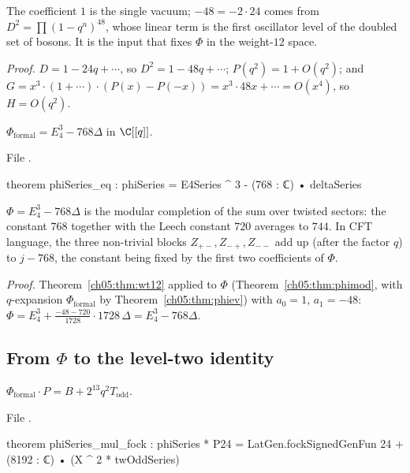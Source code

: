 \begin{physics}
The coefficient $1$ is the single vacuum; $-48=-2\cdot24$ comes from $D^2=\prod(1-q^n)^{48}$, whose linear term is the first oscillator level of the doubled set of bosons. It is the input that fixes $\Phi$ in the weight-$12$ space.
\end{physics}
\noindent\emph{Proof.} $D = 1 - 24q + \cdots$, so $D^2 = 1 - 48q+\cdots$; $P(q^2) = 1 + O(q^2)$; and $G =
x^3\cdot(1+\cdots)\cdot(P(x)-P(-x)) = x^3\cdot 48x + \cdots = O(x^4)$, so $H = O(q^2)$.

\begin{theorem}[$\Phi = E_4^3 - 768\Delta$]\label{ch05:thm:phieq}
$\Phi_{\mathrm{formal}} = E_4^3 - 768\Delta$ in $\C[[q]]$.
\end{theorem}
\noindent File .
\begin{leancode}
theorem phiSeries_eq : phiSeries = E4Series ^ 3 - (768 : ℂ) • deltaSeries
\end{leancode}

\begin{physics}
$\Phi=E_4^3-768\Delta$ is the modular completion of the sum over twisted sectors: the constant $768$ together with the Leech constant $720$ averages to $744$. In CFT language, the three non-trivial blocks $Z_{+-},Z_{-+},Z_{--}$ add up (after the factor $q$) to $j-768$, the constant being fixed by the first two coefficients of $\Phi$.
\end{physics}
\noindent\emph{Proof.} Theorem~\ref{ch05:thm:wt12} applied to $\Phi$ (Theorem~\ref{ch05:thm:phimod}, with
$q$-expansion $\Phi_{\mathrm{formal}}$ by Theorem~\ref{ch05:thm:phiev}) with $a_0 = 1$, $a_1 = -48$:
$\Phi = E_4^3 + \frac{-48-720}{1728}\cdot1728\,\Delta = E_4^3 - 768\Delta$.

\subsection{From \texorpdfstring{$\Phi$}{Phi} to the level-two identity}

\begin{proposition}\label{ch05:prop:phimulP}
$\Phi_{\mathrm{formal}}\cdot P = B + 2^{13}q^2T_{\mathrm{odd}}$.
\end{proposition}
\noindent File .
\begin{leancode}
theorem phiSeries_mul_fock :
    phiSeries * P24 = LatGen.fockSignedGenFun 24 + (8192 : ℂ) • (X ^ 2 * twOddSeries)
\end{leancode}

